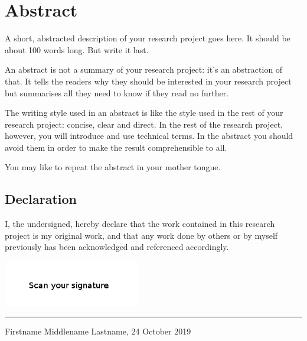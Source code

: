 \chapter*{Abstract} 

A short, abstracted description of your research project goes here. 
It should be about 100 words long. But write it last.

An abstract is not a summary of your research project: it's an abstraction of that. 
It tells the readers why they should be interested in your research project but summarises all
they need to know if they read no further.

The writing style used in an abstract is like the style used in the rest of your research project: concise, clear and direct. 
In the rest of the research project, however, you will introduce and use technical terms. In the abstract you should
avoid them in order to make the result comprehensible to all.

You may like to repeat the abstract in your mother tongue.



\vfill
\section*{Declaration}
I, the undersigned, hereby declare that the work contained in this research project is my original work, and that any work done by others or by myself previously has been acknowledged and referenced accordingly.

\includegraphics[height=2cm]{images/signature.png} \newline \hrule
Firstname Middlename Lastname, 24 October 2019

